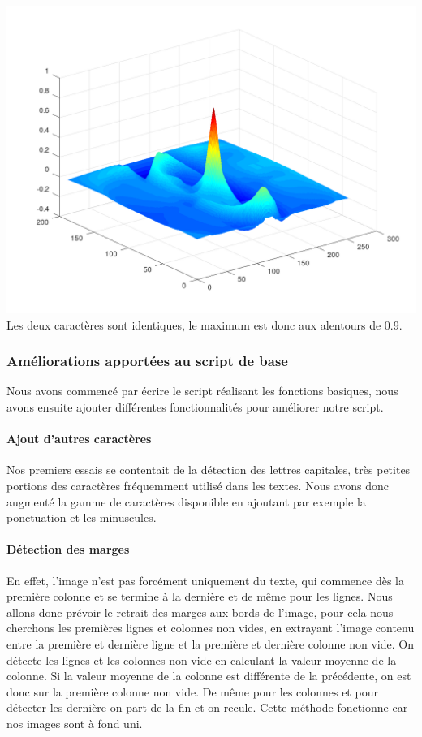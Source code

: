\documentclass[a4paper,12pt,titlepage]{report}
\begin{document}
	\includegraphics[scale=0.25]{../illus/2corv.png}
	Les deux caractères sont identiques, le maximum est donc aux alentours de 0.9.
	
	\subsubsection{Améliorations apportées au script de base}
	Nous avons commencé par écrire le script réalisant les fonctions basiques, nous avons ensuite ajouter différentes fonctionnalités pour améliorer notre script.
	\paragraph{Ajout d'autres caractères}
	Nos premiers essais se contentait de la détection des lettres capitales, très petites portions des caractères fréquemment utilisé dans les textes. Nous avons donc augmenté la gamme de caractères disponible en ajoutant par exemple la ponctuation et les minuscules.	
	\paragraph{Détection des marges} 
	En effet, l'image n'est pas forcément uniquement du texte, qui commence dès la première colonne et se termine à la dernière et de même pour les lignes.
	Nous allons donc prévoir le retrait des marges aux bords de l'image, pour cela nous cherchons les premières lignes et colonnes non vides, en extrayant l'image contenu entre la première et dernière ligne et la première et dernière colonne non vide. On détecte les lignes et les colonnes non vide en calculant la valeur moyenne de la colonne. Si la valeur moyenne de la colonne est différente de la précédente, on est donc sur la première colonne non vide. De même pour les colonnes et pour détecter les dernière on part de la fin et on recule.
	Cette méthode fonctionne car nos images sont à fond uni.
\end{document}
